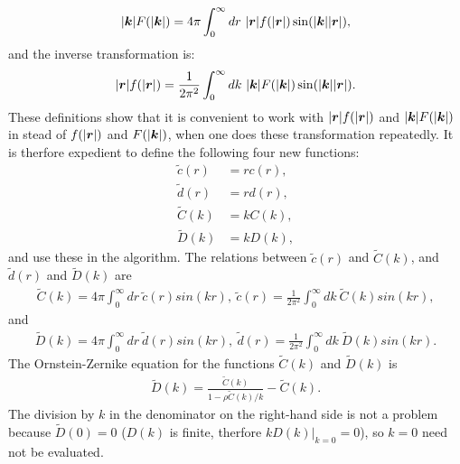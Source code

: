 \begin{align}
|\boldsymbol{k}|F(|\boldsymbol{k}|) = 4 \pi \int_0^\infty dr~|\boldsymbol{r}| f(|\boldsymbol{r}|) \sin(|\boldsymbol{k}||\boldsymbol{r}|),
\end{align}
and the inverse transformation is:
\begin{align}
|\boldsymbol{r}|f(|\boldsymbol{r}|) = \frac{1}{2 \pi^2} \int_0^\infty dk~|\boldsymbol{k}| F(|\boldsymbol{k}|) \sin(|\boldsymbol{k}||\boldsymbol{r}|).
\end{align}
These definitions show that it is convenient to work with $|\boldsymbol{r}|f(|\boldsymbol{r}|)$ and $|\boldsymbol{k}|F(|\boldsymbol{k}|)$ in stead of $f(|\boldsymbol{r}|)$ and $F(|\boldsymbol{k}|)$, when one does these transformation repeatedly.
It is therfore expedient to define the following four new functions:
\begin{align}
\tilde{c}(r) &= r c(r), \\
\tilde{d}(r) &= r d(r), \\
\tilde{C}(k) &= k C(k), \\
\tilde{D}(k) &= k D(k),
\end{align}
and use these in the algorithm.
The relations between $\tilde{c}(r)$ and $\tilde{C}(k)$, and
$\tilde{d}(r)$ and $\tilde{D}(k)$ are
\begin{align}\label{eq:c_tilde_ft_pair}
\tilde{C}(k) = 4 \pi \int_0^\infty dr~
    \tilde{c}(r) sin(k r), ~
\tilde{c}(r) = \frac{1}{2 \pi^2} \int_0^\infty dk~
    \tilde{C}(k) sin(k r),
\end{align}
and
\begin{align}\label{eq:d_tilde_ft_pair}
\tilde{D}(k) = 4 \pi \int_0^\infty dr~
    \tilde{d}(r) sin(k r), ~
\tilde{d}(r) = \frac{1}{2 \pi^2} \int_0^\infty dk~
    \tilde{D}(k) sin(k r).
\end{align}
The Ornstein-Zernike equation for the functions $\tilde{C}(k)$ and $\tilde{D}(k)$ is
\begin{align}\label{eq:oz_D_tilde_C_tilde}
\tilde{D}(k) = \frac{\tilde{C}(k)}{1-\rho \tilde{C}(k)/k}
    - \tilde{C}(k).
\end{align}
The division by $k$ in the denominator on the right-hand side
is not a problem because $\tilde{D}(0) = 0$ ($D(k)$ is finite, therfore $kD(k)|_{k=0}=0$), so $k=0$ need not be evaluated.

